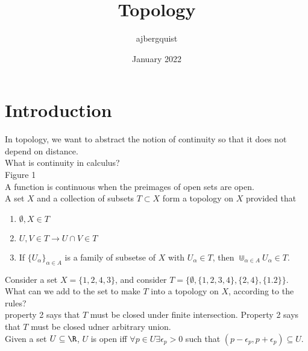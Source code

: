 \documentclass{article}
\title{Topology}
\author{ajbergquist }
\date{January 2022}
\begin{document}
\maketitle

\section{Introduction}

In topology, we want to abstract the notion of continuity so that it does not depend on distance.\\

What is continuity in calculus? \\

Figure 1\\

 A function is continuous when the preimages of open sets are open. \\

 A set $X$ and a collection of subsets $T\subset X$ form a topology on $X$ provided that
\begin{enumerate}
    \item $\emptyset,X\in T$\\
    \item $U,V\in T \rightarrow U\cap V \in T$
    \item If $\{U_\alpha\}_{\alpha\in A}$ is a family of subsetse of $X$ with $U_\alpha\in T$, then $\Cup_{\alpha\in A}U_\alpha \in T$.
\end{enumerate}

Consider a set $X = \{1,2,4,3\}$, and consider $T = \{\emptyset , \{1,2,3,4\},\{2,4\},\{1.2\}\}$. What can we add to the set to make $T$ into a topology on $X$, according to the rules? \\

 property 2 says that $T$ must be closed under finite intersection. Property 2 says that $T$ must be closed udner arbitrary union.\\


 Given a set $U\subseteq \R$, $U$ is open iff $\forall p\in U \exists \epsilon_p > 0$ such that $(p- \epsilon_p,p+\epsilon_p) \subseteq U$.
\end{document}
